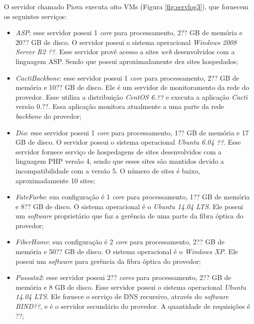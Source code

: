 O servidor chamado Piova executa oito \ac{VM}s (Figura \ref{fig:servlog3}), que fornecem os seguintes serviços:
\begin{itemize}
 \item \textit{ASP}: esse servidor possui 1 \textit{core} para processamento, 2?? GB de memória e 20?? GB de disco. O servidor possui o sistema 
 operacional \textit{Windows 2008 Server R2 ??}. Esse servidor provê acesso a sites \textit{web} desenvolvidos com a linguagem \ac{ASP}.
 Sendo que possui aproximadamente dez sites hospedados;
 
 \item \textit{CactiBackbone}: esse servidor possui 1 \textit{core} para processamento, 2?? GB de memória e 10?? GB de disco. Ele é um servidor
 de monitoramento da rede do provedor. Esse utiliza a distribuição \textit{CentOS 6.??} e executa a aplicação \textit{Cacti} versão 0.??. 
 Essa aplicação monitora atualmente a uma parte da rede \textit{backbone} do provedor;
 
 \item \textit{Dio}: esse servidor possui 1 \textit{core} para processamento, 1?? GB de memória e 17 GB de disco. O servidor possui o sistema 
 operacional \textit{Ubuntu 6.04 ??}. Esse servidor fornece serviço de hospedagens de sites desenvolvidos com a linguagem \ac{PHP} versão 4, 
 sendo que esses sites são mantidos devido a incompatibilidade com a versão 5. O número de sites é baixo, aproximadamente 10 sites;
 
 \item \textit{FateFurbo}: sua configuração é 1 \textit{core} para processamento, 1?? GB de memória e 8?? GB de disco. O sistema operacional é o 
 \textit{Ubuntu 14.04 \ac{LTS}}. Ele possui um \textit{software} proprietário que faz a gerência de uma parte da fibra óptica do provedor;
 
 \item \textit{FiberHome}: sua configuração é 2 \textit{core} para processamento, 2?? GB de memória e 50?? GB de disco. O sistema operacional é o 
 \textit{Windows XP}. Ele possui um \textit{software} para gerência da fibra óptica do provedor;
 
 \item \textit{Passata2}: esse servidor possui 2?? \textit{cores} para processamento, 2?? GB de memória e 8 GB de disco. Esse servidor possui o 
 sistema operacional \textit{Ubuntu 14.04 \ac{LTS}}. Ele fornece o serviço de \ac{DNS} recursivo, através do \textit{software} \textit{BIND??}, 
 e é o servidor secundário do provedor. A quantidade de requisições é ??;
 

\end{itemize}
